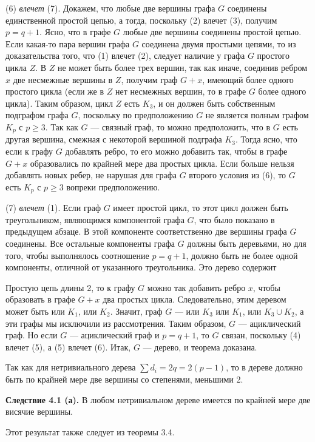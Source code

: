 (6) \textit{влечет} (7). Докажем, что любые две вершины графа \( G \) соединены единственной простой цепью, а тогда, поскольку (2) влечет (3), получим \( p = q + 1 \). Ясно, что в графе \( G \) любые две вершины соединены простой цепью. Если какая-то пара вершин графа \( G \) соединена двумя простыми цепями, то из доказательства того, что (1) влечет (2), следует наличие у графа \( G \) простого цикла \( Z \). В \( Z \) не может быть более трех вершин, так как иначе, соединив ребром \( x \) две несмежные вершины в \( Z \), получим граф \( G + x \), имеющий более одного простого цикла (если же в \( Z \) нет несмежных вершин, то в графе \( G \) более одного цикла). Таким образом, цикл \( Z \) есть \( K_3 \), и он должен быть собственным подграфом графа \( G \), поскольку по предположению \( G \) не является полным графом \( K_p \) с \( p \geq 3 \). Так как \( G \) — связный граф, то можно предположить, что в \( G \) есть другая вершина, смежная с некоторой вершиной подграфа \( K_3 \). Тогда ясно, что если к графу \( G \) добавлять ребро, то его можно добавить так, чтобы в графе \( G + x \) образовались по крайней мере два простых цикла. Если больше нельзя добавлять новых ребер, не нарушая для графа \( G \) второго условия из (6), то \( G \) есть \( K_p \) с \( p \geq 3 \) вопреки предположению.

(7) \textit{влечет} (1). Если граф \( G \) имеет простой цикл, то этот цикл должен быть треугольником, являющимся компонентой графа \( G \), что было показано в предыдущем абзаце. В этой компоненте соответственно две вершины графа \( G \) соединены. Все остальные компоненты графа \( G \) должны быть деревьями, но для того, чтобы выполнялось соотношение \( p = q + 1 \), должно быть не более одной компоненты, отличной от указанного треугольника. Это дерево содержит

Простую цепь длины 2, то к графу \( G \) можно так добавить ребро \( x \), чтобы образовать в графе \( G + x \) два простых цикла. Следовательно, этим деревом может быть или \( K_1 \), или \( K_2 \). Значит, граф \( G \) — или \( K_3 \) или \( K_1 \), или \( K_3 \cup K_2 \), а эти графы мы исключили из рассмотрения. Таким образом, \( G \) — ациклический граф. Но если \( G \) — ациклический граф и \( p = q + 1 \), то \( G \) связан, поскольку (4) влечет (5), а (5) влечет (6). Итак, \( G \) — дерево, и теорема доказана.

Так как для нетривиального дерева \(\sum d_i = 2q = 2(p - 1)\), то в дереве должно быть по крайней мере две вершины со степенями, меньшими 2.

\textbf{Следствие 4.1 (а).} В любом нетривиальном дереве имеется по крайней мере две висячие вершины.

Этот результат также следует из теоремы 3.4.
